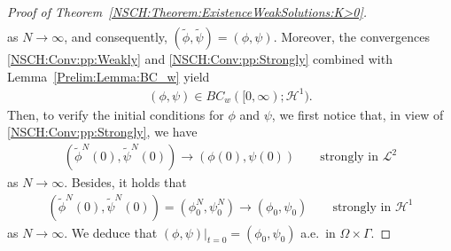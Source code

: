 \documentclass[11pt,reqno]{amsart}
\theoremstyle{remark}
\numberwithin{equation}{section}
\newcommand{\Om}{\Omega}
\newcommand{\Ga}{\Gamma}
\begin{document}
\begin{proof}[Proof of Theorem~\ref{NSCH:Theorem:ExistenceWeakSolutions:K>0}]
\begin{align*}
    \end{align*}
    as $N\rightarrow\infty$, and consequently, $(\widetilde \phi,\widetilde \psi) = (\phi,\psi)$. Moreover, the convergences \eqref{NSCH:Conv:pp:Weakly} and \eqref{NSCH:Conv:pp:Strongly} combined with Lemma~\ref{Prelim:Lemma:BC_w} yield
    \begin{align*}
        (\phi,\psi) \in BC_w([0,\infty);\mathcal{H}^1).
    \end{align*}
    Then, to verify the initial conditions for $\phi$ and $\psi$, we first notice that, in view of \eqref{NSCH:Conv:pp:Strongly}, we have 
\begin{align*}
	(\widetilde\phi^N(0),\widetilde\psi^N(0))\rightarrow (\phi(0),\psi(0))\qquad\text{strongly in~}\mathcal{L}^2
\end{align*}
as $N\rightarrow\infty$. Besides, it holds that
\begin{align*}
	(\widetilde\phi^N(0),\widetilde\psi^N(0)) = (\phi_0^N,\psi_0^N)\rightarrow (\phi_0,\psi_0) \qquad\text{strongly in~}\mathcal{H}^1
\end{align*}
as $N\rightarrow\infty$. We deduce that $(\phi,\psi)\vert_{t=0} = (\phi_0,\psi_0)$ a.e.~in $\Om\times\Ga$.


\end{proof}
\end{document}
